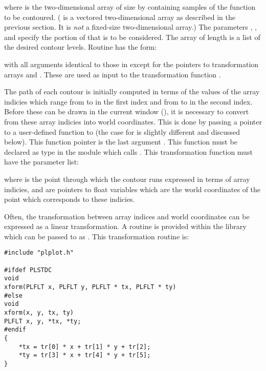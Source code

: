 
where  is the two-dimensional array of size
 by  containing samples of the function to be
contoured.  ( is a vectored two-dimensional array as described
in the previous section.  It is \emph{not} a fixed-size two-dimensional
array.) The parameters , ,  and 
specify the portion of  that is to be considered.  The array
 of length  is a list of the desired contour
levels.  Routine  has the form:


with all arguments identical to those in  except for the
pointers to transformation arrays  and .  These are
used as input to the transformation function .

The path of each contour is initially computed in terms of the values of
the array indicies which range from  to  in the first
index and from  to  in the second index.  Before
these can be drawn in the current window (), it is
necessary to convert from these array indicies into world coordinates.
This is done by passing a pointer to a user-defined function to
 (the case for  is slightly different and
discussed below).  This function pointer is the last argument
.  This function must be declared as type  in the
module which calls .  This transformation function must
have the parameter list:


where  is the point through which the contour runs
expressed in terms of array indicies, and  are pointers
to float variables which are the world coordinates of the point which
corresponds to these indicies.

Often, the transformation between array indices and world coordinates can be
expressed as a linear transformation.  A routine is provided within the
library which can be passed to  as .  This
transformation routine is:

\begin{verbatim}
#include "plplot.h"

#ifdef PLSTDC
void 
xform(PLFLT x, PLFLT y, PLFLT * tx, PLFLT * ty)
#else
void 
xform(x, y, tx, ty)
PLFLT x, y, *tx, *ty;
#endif
{
    *tx = tr[0] * x + tr[1] * y + tr[2];
    *ty = tr[3] * x + tr[4] * y + tr[5];
}
\end{verbatim}

